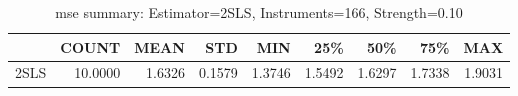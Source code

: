 \begin{table}[ht]
\centering
\caption{mse summary: Estimator=2SLS, Instruments=166, Strength=0.10}
\begin{tabular}{lrrrrrrrr}
\toprule
 & COUNT & MEAN & STD & MIN & 25\% & 50\% & 75\% & MAX \\
\midrule
2SLS & 10.0000 & 1.6326 & 0.1579 & 1.3746 & 1.5492 & 1.6297 & 1.7338 & 1.9031 \\
\bottomrule
\end{tabular}
\end{table}
